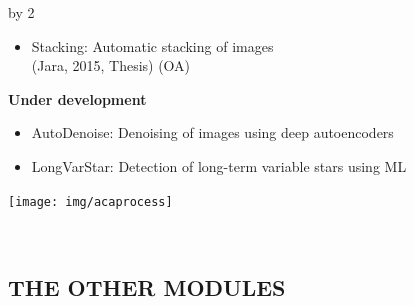 \documentclass[11pt]{scrartcl}
\def\anzspalten{2}
\newlength{\kastenwidth}
\newenvironment{kasten}{
  \begin{lrbox}{\dummybox}
    \begin{minipage}{\linewidth}}
    {\end{minipage}
  \end{lrbox}
  \raisebox{-\depth}{\psshadowbox[cornersize=absolute,linearc=14pt,framesep=1em]{\usebox{\dummybox}}}\\[0.5em]}
\newenvironment{spalte}{
  \setlength\kastenwidth{1.2\textwidth}
  \divide\kastenwidth by \anzspalten
  \begin{minipage}[t]{\kastenwidth}}{\end{minipage}}
\begin{document}
\begin{lrbox}{\spalten}
{\begin{spalte}
\begin{kasten}
\begin{minipage}{0.5\linewidth}
\begin{itemize}
Thesis) (OA)
\item Stacking: Automatic stacking of images \\ (Jara, 2015, Thesis) (OA)
\end{itemize}
\textbf{Under development}
\begin{itemize}
\item AutoDenoise: Denoising of images using deep autoencoders
\item LongVarStar: Detection of long-term variable stars using ML
\end{itemize}
			\end{minipage}
			\begin{minipage}{0.5\textwidth}
			\begin{center}
                        	\texttt{[image: img/acaprocess]}
			\end{center}
          \end{minipage}
	 \end{kasten}

	\begin{kasten}

        \section*{\hspace{0.2cm} {\color{red} THE OTHER MODULES} }


\end{kasten}
\end{spalte}}
\end{lrbox}
\end{document}
